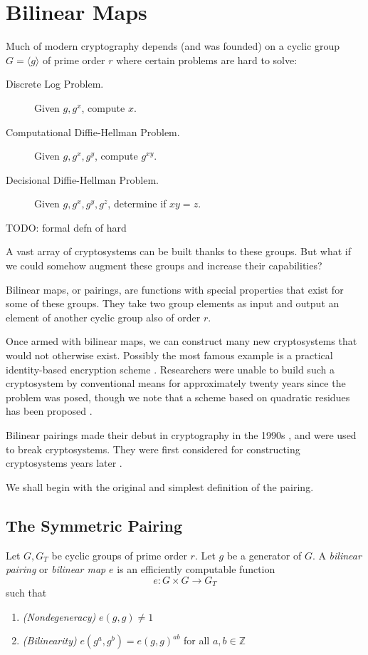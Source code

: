 \chapter{Bilinear Maps}

Much of modern cryptography depends (and was founded\cite{diffie76new})
on a cyclic group $G = \langle g \rangle$ of prime order $r$ where certain
problems are hard to solve:

\begin{description}
\item [Discrete Log Problem.]
Given $g, g^x$, compute $x$.
\item [Computational Diffie-Hellman Problem.]
Given $g, g^x, g^y$, compute $g^{x y}$.
\item [Decisional Diffie-Hellman Problem.]
Given $g, g^x, g^y, g^z$, determine if $x y = z$.
\end{description}

TODO: formal defn of hard

A vast array of cryptosystems can be built thanks to these groups. 
But what if we could somehow augment these groups and increase their
capabilities?

Bilinear maps, or pairings, are functions with special
properties that exist for some of these groups.
They take two group elements as input and output an element of another cyclic
group also of order $r$.

Once armed with bilinear maps, we can construct many new cryptosystems
that would not otherwise exist. Possibly the most famous example is a
practical identity-based encryption scheme \cite{bf}.
Researchers were unable to build such a cryptosystem by
conventional means for approximately
twenty years since the problem was posed, though we note that a
scheme based on quadratic residues has been proposed \cite{cocks01}.

Bilinear pairings made their debut in cryptography in the 1990s \cite{mov,fr,fmr},
and were used to break cryptosystems. They were first considered for
constructing cryptosystems years later \cite{sok}.

We shall begin with the original and simplest definition of the pairing.

\section{The Symmetric Pairing}

Let $G, G_T$ be cyclic groups of prime order $r$.
Let $g$ be a generator of $G$.
A \emph{bilinear pairing} or \emph{bilinear map}
$e$ is an efficiently computable function
\[
e:G \times G \rightarrow G_T
\]
such that
\begin{enumerate}
\item
\emph{(Nondegeneracy)}
$e(g,g) \ne 1$
\item
\emph{(Bilinearity)}
$e(g^a, g^b) = e(g,g)^{a b}$ for all $a, b \in \mathbb{Z}$
\end{enumerate}

